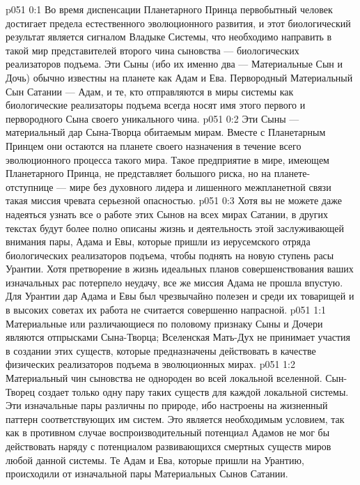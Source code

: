 \author{Вторичный Сын\hyp{}Ланонандек}
\vs p051 0:1 Во время диспенсации Планетарного Принца первобытный человек достигает предела естественного эволюционного развития, и этот биологический результат является сигналом Владыке Системы, что необходимо направить в такой мир представителей второго чина сыновства --- биологических реализаторов подъема. Эти Сыны (ибо их именно два --- Материальные Сын и Дочь) обычно известны на планете как Адам и Ева. Первородный Материальный Сын Сатании --- Адам, и те, кто отправляются в миры системы как биологические реализаторы подъема всегда носят имя этого первого и первородного Сына своего уникального чина.
\vs p051 0:2 Эти Сыны --- материальный дар Сына\hyp{}Творца обитаемым мирам. Вместе с Планетарным Принцем они остаются на планете своего назначения в течение всего эволюционного процесса такого мира. Такое предприятие в мире, имеющем Планетарного Принца, не представляет большого риска, но на планете\hyp{}отступнице --- мире без духовного лидера и лишенного межпланетной связи такая миссия чревата серьезной опасностью.
\vs p051 0:3 Хотя вы не можете даже надеяться узнать все о работе этих Сынов на всех мирах Сатании, в других текстах будут более полно описаны жизнь и деятельность этой заслуживающей внимания пары, Адама и Евы, которые пришли из иерусемского отряда биологических реализаторов подъема, чтобы поднять на новую ступень расы Урантии. Хотя претворение в жизнь идеальных планов совершенствования ваших изначальных рас потерпело неудачу, все же миссия Адама не прошла впустую. Для Урантии дар Адама и Евы был чрезвычайно полезен и среди их товарищей и в высоких советах их работа не считается совершенно напрасной.
\vs p051 1:1 Материальные или различающиеся по половому признаку Сыны и Дочери являются отпрысками Сына\hyp{}Творца; Вселенская Мать\hyp{}Дух не принимает участия в создании этих существ, которые предназначены действовать в качестве физических реализаторов подъема в эволюционных мирах.
\vs p051 1:2 Материальный чин сыновства не однороден во всей локальной вселенной. Сын\hyp{}Творец создает только одну пару таких существ для каждой локальной системы. Эти изначальные пары различны по природе, ибо настроены на жизненный паттерн соответствующих им систем. Это является необходимым условием, так как в противном случае воспроизводительный потенциал Адамов не мог бы действовать наряду с потенциалом развивающихся смертных существ миров любой данной системы. Те Адам и Ева, которые пришли на Урантию, происходили от изначальной пары Материальных Сынов Сатании.
